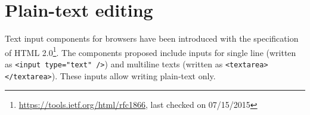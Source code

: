 \section{Plain-text editing}

Text input components for browsers have been introduced with the specification of HTML 2.0\footnote{\url{https://tools.ietf.org/html/rfc1866}, last checked on 07/15/2015}. The components proposed include inputs for single line (written as \texttt{<input type="text" />}) and multiline texts (written as \texttt{<textarea></textarea>}). These inputs allow writing plain-text only.
